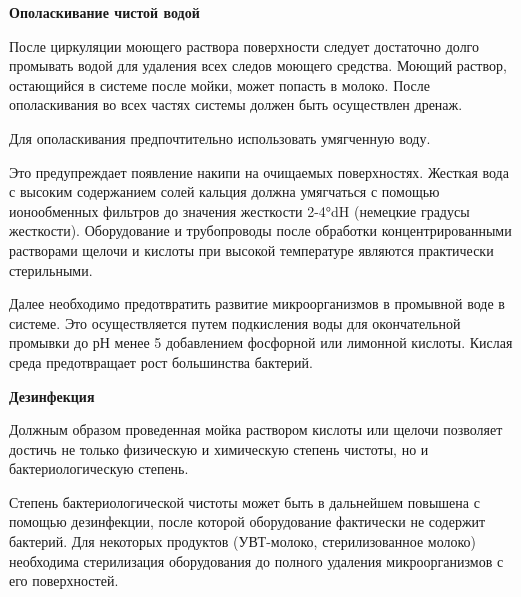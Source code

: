 \documentclass[a4paper,12pt,oneside]{extarticle}
\begin{document}
	 \begin{flushleft}
	 	\bfseries 	Ополаскивание чистой водой
	 \end{flushleft}	
	 
	 
	 	\begin{flushleft}
	 	После циркуляции моющего раствора поверхности следует достаточно долго промывать водой для удаления всех следов моющего средства. Моющий раствор, остающийся в системе после мойки, может попасть в молоко. После ополаскивания во всех частях системы должен быть осуществлен дренаж.
	 \end{flushleft}
	
 \begin{flushleft}
		Для ополаскивания предпочтительно использовать умягченную воду.
\end{flushleft}	


\begin{flushleft}
	Это предупреждает появление накипи на очищаемых поверхностях. Жесткая вода с высоким содержанием солей кальция должна умягчаться с помощью ионообменных фильтров до значения жесткости 2-4°dH (немецкие градусы жесткости).
	Оборудование и трубопроводы после обработки концентрированными растворами щелочи и кислоты при высокой температуре являются практически стерильными.
\end{flushleft}

\begin{flushleft}
	Далее необходимо предотвратить развитие микроорганизмов в промывной воде в системе. Это осуществляется путем подкисления воды для окончательной промывки до рН менее 5 добавлением фосфорной или лимонной кислоты. Кислая среда предотвращает рост большинства бактерий.
\end{flushleft}

 \begin{flushleft}
	\bfseries 	Дезинфекция
\end{flushleft}	

 \begin{flushleft}
		Должным образом проведенная мойка раствором кислоты или щелочи позволяет достичь не только физическую и химическую степень чистоты, но и бактериологическую степень.
\end{flushleft}	

\begin{flushleft}
	Степень бактериологической чистоты может быть в дальнейшем повышена с помощью дезинфекции, после которой оборудование фактически не содержит бактерий. Для некоторых продуктов (УВТ-молоко, стерилизованное молоко) необходима стерилизация оборудования до полного удаления микроорганизмов с его поверхностей.
\end{flushleft}
\end{document}
